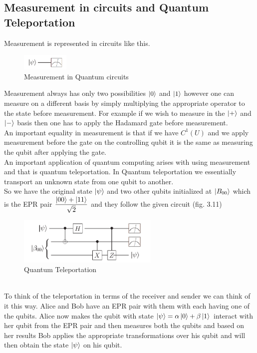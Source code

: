 \documentclass{report}
\begin{document}
\subsection{Measurement in circuits and Quantum Teleportation}
Measurement is represented in circuits like this.\\
\begin{figure}[ht]
\centering
\includegraphics[width = 0.2\textwidth]{images/measurement.png}
\caption{Measurement in Quantum circuits}
\end{figure}
Measurement always has only two possibilities $\ket{0}$ and $\ket{1}$ however one can measure on a different basis by simply multiplying the appropriate operator to the state before measurement. For example if we wish to measure in the $\ket{+}$ and $\ket{-}$ basis then one has to apply the Hadamard gate before measurement.\\
An important equality in measurement is that if we have $C^1(U)$ and we apply measurement before the gate on the controlling qubit it is the same as measuring the qubit after applying the gate.\\
An important application of quantum computing arises with using measurement and that is quantum teleportation. In Quantum teleportation we essentially transport an unknown state from one qubit to another.\\
So we have the original state $\ket{\psi}$ and two other qubits initialized at $\ket{B_{00}}$ which is the EPR pair $\dfrac{\ket{00} + \ket{11}}{\sqrt{2}}$ and they follow the given circuit (fig. 3.11)\\
\begin{figure}[ht]
\centering
\includegraphics[width = 0.6\textwidth]{images/teleportation.png}
\caption{Quantum Teleportation}
\end{figure}\\
To think of the teleportation in terms of the receiver and sender we can think of it this way. Alice and Bob have an EPR pair with them with each having one of the qubits. Alice now makes the qubit with state $\ket{\psi} = \alpha\ket{0} + \beta\ket{1}$ interact with her qubit from the EPR pair and then measures both the qubits and based on her results Bob applies the appropriate transformations over his qubit and will then obtain the state $\ket{\psi}$ on his qubit.\\
\end{document}
